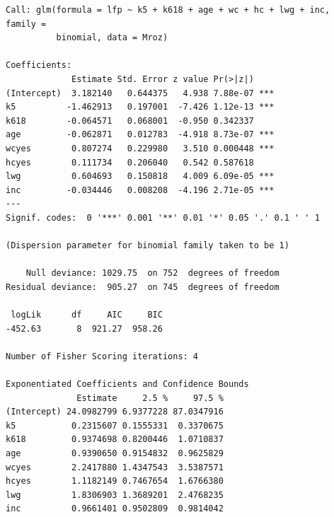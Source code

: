 \documentclass[
]{article}
\begin{document}
\begin{verbatim}
Call: glm(formula = lfp ~ k5 + k618 + age + wc + hc + lwg + inc, family =
          binomial, data = Mroz)

Coefficients:
             Estimate Std. Error z value Pr(>|z|)    
(Intercept)  3.182140   0.644375   4.938 7.88e-07 ***
k5          -1.462913   0.197001  -7.426 1.12e-13 ***
k618        -0.064571   0.068001  -0.950 0.342337    
age         -0.062871   0.012783  -4.918 8.73e-07 ***
wcyes        0.807274   0.229980   3.510 0.000448 ***
hcyes        0.111734   0.206040   0.542 0.587618    
lwg          0.604693   0.150818   4.009 6.09e-05 ***
inc         -0.034446   0.008208  -4.196 2.71e-05 ***
---
Signif. codes:  0 '***' 0.001 '**' 0.01 '*' 0.05 '.' 0.1 ' ' 1

(Dispersion parameter for binomial family taken to be 1)

    Null deviance: 1029.75  on 752  degrees of freedom
Residual deviance:  905.27  on 745  degrees of freedom

 logLik      df     AIC     BIC 
-452.63       8  921.27  958.26 

Number of Fisher Scoring iterations: 4

Exponentiated Coefficients and Confidence Bounds
              Estimate     2.5 %     97.5 %
(Intercept) 24.0982799 6.9377228 87.0347916
k5           0.2315607 0.1555331  0.3370675
k618         0.9374698 0.8200446  1.0710837
age          0.9390650 0.9154832  0.9625829
wcyes        2.2417880 1.4347543  3.5387571
hcyes        1.1182149 0.7467654  1.6766380
lwg          1.8306903 1.3689201  2.4768235
inc          0.9661401 0.9502809  0.9814042
\end{verbatim}
\end{document}
